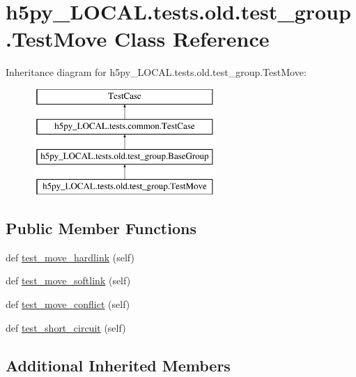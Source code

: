 \hypertarget{classh5py__LOCAL_1_1tests_1_1old_1_1test__group_1_1TestMove}{}\section{h5py\+\_\+\+L\+O\+C\+A\+L.\+tests.\+old.\+test\+\_\+group.\+Test\+Move Class Reference}
\label{classh5py__LOCAL_1_1tests_1_1old_1_1test__group_1_1TestMove}
Inheritance diagram for h5py\+\_\+\+L\+O\+C\+A\+L.\+tests.\+old.\+test\+\_\+group.\+Test\+Move\+:\begin{figure}[H]
\begin{center}
\leavevmode
\includegraphics[height=4.000000cm]{classh5py__LOCAL_1_1tests_1_1old_1_1test__group_1_1TestMove}
\end{center}
\end{figure}
\subsection*{Public Member Functions}
\begin{DoxyCompactItemize}
\item 
def \hyperlink{classh5py__LOCAL_1_1tests_1_1old_1_1test__group_1_1TestMove_a5acff2a135683cd007d4756f804fd44a}{test\+\_\+move\+\_\+hardlink} (self)
\item 
def \hyperlink{classh5py__LOCAL_1_1tests_1_1old_1_1test__group_1_1TestMove_a868d4273d7c2b45d0a05b056976150cc}{test\+\_\+move\+\_\+softlink} (self)
\item 
def \hyperlink{classh5py__LOCAL_1_1tests_1_1old_1_1test__group_1_1TestMove_ae632d1cf9e1fe18545872781eeb8e7b6}{test\+\_\+move\+\_\+conflict} (self)
\item 
def \hyperlink{classh5py__LOCAL_1_1tests_1_1old_1_1test__group_1_1TestMove_a92f134102c1fc4f801ed91055e4cfddb}{test\+\_\+short\+\_\+circuit} (self)
\end{DoxyCompactItemize}
\subsection*{Additional Inherited Members}



